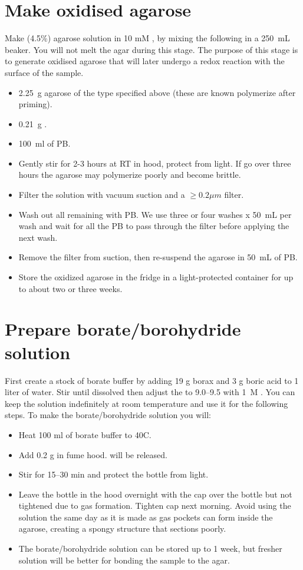 \documentclass[paper=a4, fontsize=11pt]{scrartcl} %
\numberwithin{equation}{section} %
\numberwithin{figure}{section} %
\numberwithin{table}{section} %
\begin{document}
\section{Make oxidised agarose}
Make (4.5\%) agarose solution in 10 mM , by mixing the following in a 250~mL beaker. You 
will not melt the agar during this stage. The purpose of this stage is to generate oxidised agarose
that will later undergo a redox reaction with the surface of the sample.
\begin{itemize}
\item 2.25~g agarose of the type specified above (these are known polymerize after priming). 
\item 0.21~g .
\item 100~ml of PB. 
\item Gently stir for 2-3 hours at RT in hood, protect from light.
If go over three hours the agarose may polymerize poorly and become brittle.
\item Filter the solution with vacuum suction and a $\ge 0.2 \mu m$ filter.
\item Wash out all remaining  with PB. 
We use three or four washes x 50~mL per wash and wait for all the PB to pass through the filter before applying the next wash.
\item Remove the filter from suction, then re-suspend  the agarose in 50~mL of PB.
\item Store the oxidized agarose in the fridge in a light-protected container for up to about two or three weeks.
\end{itemize}

 

\section{Prepare borate/borohydride solution}
First create a stock of borate buffer by adding 19 g borax and 3 g boric acid to 1 liter of water. 
Stir until dissolved then adjust the \pH to 9.0--9.5 with 1~M .
You can keep the solution indefinitely at room temperature and use it for the following steps.
To make the borate/borohydride solution you will:
\begin{itemize}
\item Heat 100 ml of borate buffer to 40\degree C.
\item Add 0.2 g  in fume hood.  will be released.
\item Stir for 15--30 min and protect the bottle from light.
\item Leave the bottle in the hood overnight with the cap over the bottle but not tightened due to gas formation.
Tighten cap next morning. 
Avoid using the solution the same day as it is made as gas pockets can form inside the agarose, creating a spongy structure that sections poorly.
\item The borate/borohydride solution can be stored up to 1 week, but fresher solution will be better for bonding the sample to the agar.
\end{itemize}
\end{document}
